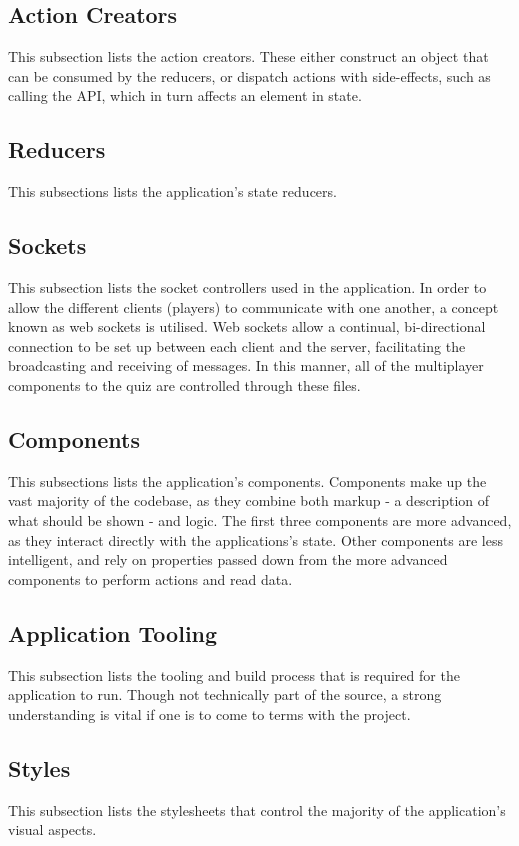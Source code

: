 \subsection{Action Creators} %
\label{sub:action_creators}
This subsection lists the action creators. These either construct an object that can be consumed by the reducers, or dispatch actions with side-effects, such as calling the API, which in turn affects an element in state.


\subsection{Reducers} %
\label{sub:reducers}
This subsections lists the application's state reducers.


\subsection{Sockets} %
\label{sub:sockets}
This subsection lists the socket controllers used in the application. In order to allow the different clients (players) to communicate with one another, a concept known as web sockets is utilised. Web sockets allow a continual, bi-directional connection to be set up between each client and the server, facilitating the broadcasting and receiving of messages. In this manner, all of the multiplayer components to the quiz are controlled through these files.


\subsection{Components} %
\label{sub:reducers}
This subsections lists the application's components. Components make up the vast majority of the codebase, as they combine both markup - a description of what should be shown - and logic. The first three components are more advanced, as they interact directly with the applications's state. Other components are less intelligent, and rely on properties passed down from the more advanced components to perform actions and read data.


\subsection{Application Tooling} %
\label{sub:api_models}
This subsection lists the tooling and build process that is required for the application to run. Though not technically part of the source, a strong understanding is vital if one is to come to terms with the project.


\subsection{Styles} %
\label{sub:styles}
This subsection lists the stylesheets that control the majority of the application's visual aspects.

